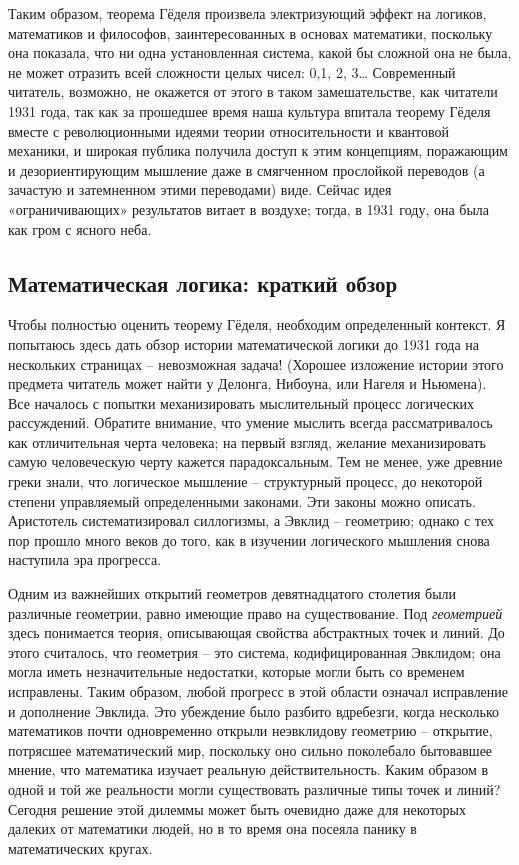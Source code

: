 \documentclass[../main.tex]{subfiles}
\begin{document}
Таким образом, теорема Гёделя произвела электризующий эффект на логиков, математиков и философов, заинтересованных в основах математики, поскольку она показала, что ни одна установленная система, какой бы сложной она не была, не может отразить всей сложности целых чисел: 0,1, 2, 3\ldots{} Современный читатель, возможно, не окажется от этого в таком замешательстве, как читатели 1931 года, так как за прошедшее время наша культура впитала теорему Гёделя вместе с революционными идеями теории относительности и квантовой механики, и широкая публика получила доступ к этим концепциям, поражающим и дезориентирующим мышление даже в смягченном прослойкой переводов (а зачастую и затемненном этими переводами) виде. Сейчас идея «ограничивающих» результатов витает в воздухе; тогда, в 1931 году, она была как гром с ясного неба.


\subsection{Математическая логика: краткий обзор}

Чтобы полностью оценить теорему Гёделя, необходим определенный контекст. Я попытаюсь здесь дать обзор истории математической логики до 1931 года на нескольких страницах \--- невозможная задача! (Хорошее изложение истории этого предмета читатель может найти у Делонга, Нибоуна, или Нагеля и Ньюмена). Все началось с попытки механизировать мыслительный процесс логических рассуждений. Обратите внимание, что умение мыслить всегда рассматривалось как отличительная черта человека; на первый взгляд, желание механизировать самую человеческую черту кажется парадоксальным. Тем не менее, уже древние греки знали, что логическое мышление \--- структурный процесс, до некоторой степени управляемый определенными законами. Эти законы можно описать. Аристотель систематизировал силлогизмы, а Эвклид \--- геометрию; однако с тех пор прошло много веков до того, как в изучении логического мышления снова наступила эра прогресса.

Одним из важнейших открытий геометров девятнадцатого столетия были различные геометрии, равно имеющие право на существование. Под \emph{геометрией} здесь понимается теория, описывающая свойства абстрактных точек и линий. До этого считалось, что геометрия \--- это система, кодифицированная Эвклидом; она могла иметь незначительные недостатки, которые могли быть со временем исправлены. Таким образом, любой прогресс в этой области означал исправление и дополнение Эвклида. Это убеждение было разбито вдребезги, когда несколько математиков почти одновременно открыли неэвклидову геометрию \--- открытие, потрясшее математический мир, поскольку оно сильно поколебало бытовавшее мнение, что математика изучает реальную действительность. Каким образом в одной и той же реальности могли существовать различные типы точек и линий? Сегодня решение этой дилеммы может быть очевидно даже для некоторых далеких от математики людей, но в то время она посеяла панику в математических кругах.
\end{document}
